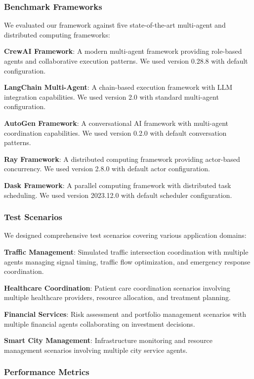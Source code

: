 \documentclass[conference]{IEEEtran}
\begin{document}
\subsubsection{Benchmark Frameworks}

We evaluated our framework against five state-of-the-art multi-agent and distributed computing frameworks:

\textbf{CrewAI Framework}: A modern multi-agent framework providing role-based agents and collaborative execution patterns. We used version 0.28.8 with default configuration.

\textbf{LangChain Multi-Agent}: A chain-based execution framework with LLM integration capabilities. We used version 2.0 with standard multi-agent configuration.

\textbf{AutoGen Framework}: A conversational AI framework with multi-agent coordination capabilities. We used version 0.2.0 with default conversation patterns.

\textbf{Ray Framework}: A distributed computing framework providing actor-based concurrency. We used version 2.8.0 with default actor configuration.

\textbf{Dask Framework}: A parallel computing framework with distributed task scheduling. We used version 2023.12.0 with default scheduler configuration.

\subsubsection{Test Scenarios}

We designed comprehensive test scenarios covering various application domains:

\textbf{Traffic Management}: Simulated traffic intersection coordination with multiple agents managing signal timing, traffic flow optimization, and emergency response coordination.

\textbf{Healthcare Coordination}: Patient care coordination scenarios involving multiple healthcare providers, resource allocation, and treatment planning.

\textbf{Financial Services}: Risk assessment and portfolio management scenarios with multiple financial agents collaborating on investment decisions.

\textbf{Smart City Management}: Infrastructure monitoring and resource management scenarios involving multiple city service agents.

\subsubsection{Performance Metrics}
\end{document}
